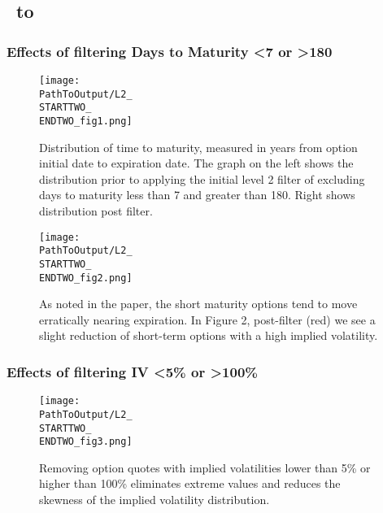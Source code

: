 \begin{appendix}
\newpage
\subsection{\STARTTWO\ to \ENDTWO }

\subsubsection{Effects of filtering Days to Maturity <7 or >180}
\begin{figure}[H] %
  \centering
  \texttt{[image: \\PathToOutput/L2\_\\STARTTWO\_\\ENDTWO\_fig1.png]}%
\captionsetup{font=normalfont}
  \caption{Distribution of time to maturity, measured in years from option initial date to expiration date. The graph on the left shows the distribution prior to applying the initial level 2 filter of excluding days to maturity less than 7 and greater than 180. Right shows distribution post filter.}
\label{fig:time2lvl2fig1}
\end{figure}

\begin{figure}[H] %
  \centering
  \texttt{[image: \\PathToOutput/L2\_\\STARTTWO\_\\ENDTWO\_fig2.png]}%
\captionsetup{font=normalfont}
  \caption{As noted in the paper, the short maturity options tend to move erratically nearing expiration. In Figure 2, post-filter (red) we see a slight reduction of short-term options with a high implied volatility.}
\label{fig:time2lvl2fig2}
\end{figure}

\subsubsection{Effects of filtering IV <5\% or >100\%}
\begin{figure}[H] %
  \centering
{}
  \texttt{[image: \\PathToOutput/L2\_\\STARTTWO\_\\ENDTWO\_fig3.png]}%
\captionsetup{font=normalfont}
  \caption{Removing option quotes with implied volatilities lower than 5\% or higher than 100\% eliminates extreme values and reduces the skewness of the implied volatility distribution.}
\label{fig:time2lvl2fig3}
\end{figure}



\end{appendix}
